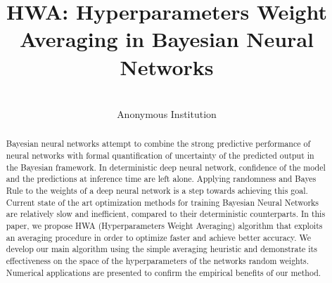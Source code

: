 \documentclass[tablecaption=bottom,wcp]{jmlr} %
\title[Hyperparameters Weight Averaging in BNNs]{HWA: Hyperparameters Weight Averaging in Bayesian Neural Networks}
\author{\Name{Anonymous Authors}\\
  \addr Anonymous Institution}
\begin{document}
\maketitle


\begin{abstract}
Bayesian neural networks attempt to combine the strong predictive performance of neural networks with formal quantification of uncertainty of the predicted output in the Bayesian framework.
In deterministic deep neural network, confidence of the model and the predictions at inference time are left alone. 
Applying randomness and Bayes Rule to the weights of a deep neural network is a step towards achieving this goal. Current state of the art optimization methods for training Bayesian Neural Networks are relatively slow and inefficient, compared to their deterministic counterparts. 
In this paper, we propose \textsc{HWA} (Hyperparameters Weight Averaging) algorithm that exploits an averaging procedure in order to optimize faster and achieve better accuracy. 
We develop our main algorithm using the simple averaging heuristic and demonstrate its effectiveness on the space of the hyperparameters of the networks random weights. 
Numerical applications are presented to confirm the empirical benefits of our method.
\end{abstract}
\end{document}
